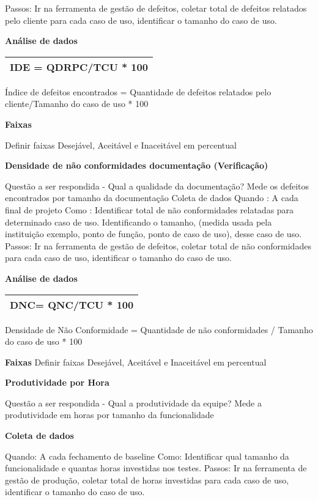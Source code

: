 Passos: Ir na ferramenta de gestão de defeitos, coletar total de defeitos relatados pelo cliente para cada caso de uso, identificar o tamanho do caso de uso.



\textbf{Análise de dados}

\begin{tabular}{|l|}
\hline
IDE = QDRPC/TCU * 100 \\ 
\hline
\end{tabular}

Índice de defeitos encontrados = Quantidade de defeitos relatados pelo cliente/Tamanho do caso de uso * 100

\textbf{Faixas}

Definir faixas Desejável, Aceitável e Inaceitável em percentual

\textbf{Densidade de não conformidades documentação (Verificação)}

Questão a ser respondida - Qual a qualidade da documentação? Mede os defeitos encontrados por tamanho da documentação Coleta de dados Quando : A cada final de projeto Como : Identificar total de não conformidades relatadas para determinado caso de uso. Identificando o tamanho, (medida usada pela instituição exemplo, ponto de função, ponto de caso de uso), desse caso de uso. Passos: Ir na ferramenta de gestão de defeitos, coletar total de não conformidades para cada caso de uso, identificar o tamanho do caso de uso.

\textbf{Análise de dados}

\begin{tabular}{|l|}
\hline
DNC= QNC/TCU * 100 \\ 
\hline
\end{tabular}

Densidade de Não Conformidade = Quantidade de não conformidades / Tamanho do caso de uso * 100

\textbf{Faixas} Definir faixas Desejável, Aceitável e Inaceitável em percentual

\textbf{Produtividade por Hora}

Questão a ser respondida - Qual a produtividade da equipe? Mede a produtividade em horas por tamanho da funcionalidade

\textbf{Coleta de dados}

Quando: A cada fechamento de baseline Como: Identificar qual tamanho da funcionalidade e quantas horas investidas nos testes. Passos: Ir na ferramenta de gestão de produção, coletar total de horas investidas para cada  caso de uso, identificar o tamanho do caso de uso.

